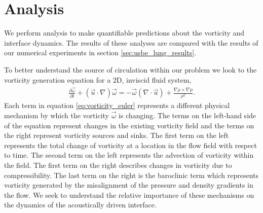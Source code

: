 \section{Analysis}%
\label{sec:usbe_lung_analysis}%
We perform analysis to make quantifiable predictions about the
vorticity and interface dynamics. The results of these
analyses are compared with the results of our numerical experiments in
section \ref{sec:usbe_lung_results}.

To better understand the source of circulation within our problem we
look to the vorticity generation equation for a 2D, inviscid fluid
system,
\begin{align} \label{eq:vorticity_euler}
  \frac{\partial \vec{\omega}}{\partial t}+\left(\vec{u}\cdot\nabla\right)\vec{\omega} =%
  - \vec{\omega}\left(\nabla\cdot\vec{u}\right) + \frac{\nabla\rho\times\nabla p}{\rho^2}.%
\end{align}
Each term in equation \eqref{eq:vorticity_euler} represents a
different physical mechanism by which the vorticity $\vec{\omega}$ is
changing. The terms on the left-hand side of the equation represent
changes in the existing vorticity field and the terms on the right
represent vorticity sources and sinks. The first term on the left
represents the total change of vorticity at a location in the flow
field with respect to time. The second term on the left represents the
advection of vorticity within the field. The first term on the right
describes changes in vorticity due to compressibility. The last term
on the right is the baroclinic term which represents vorticity
generated by the misalignment of the pressure and density gradients in
the flow. We seek to understand the relative importance of these
mechanisms on the dynamics of the acoustically driven interface.

